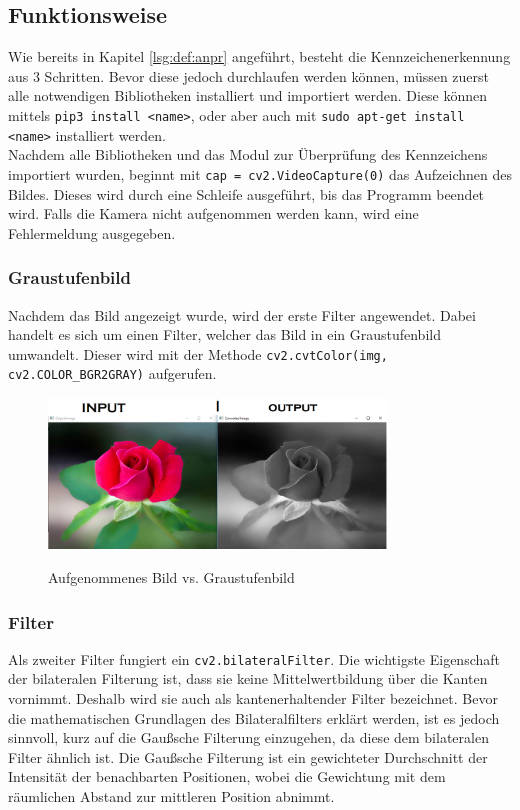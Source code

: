 \subsection{Funktionsweise}
Wie bereits in Kapitel \ref{lsg:def:anpr} angeführt, besteht die Kennzeichenerkennung aus 3 Schritten. Bevor diese jedoch durchlaufen werden können, müssen zuerst alle notwendigen Bibliotheken installiert und importiert werden. Diese können mittels \verb|pip3 install <name>|, oder aber auch mit \verb|sudo apt-get install <name>| installiert werden. \\
Nachdem alle Bibliotheken und das Modul zur Überprüfung des Kennzeichens importiert wurden, beginnt mit \verb|cap = cv2.VideoCapture(0)| das Aufzeichnen des Bildes. Dieses wird durch eine Schleife ausgeführt, bis das Programm beendet wird. Falls die Kamera nicht aufgenommen werden kann, wird eine Fehlermeldung ausgegeben.
\subsubsection{Graustufenbild}
Nachdem das Bild angezeigt wurde, wird der erste Filter angewendet. Dabei handelt es sich um einen Filter, welcher das Bild in ein Graustufenbild umwandelt. Dieser wird  mit der Methode \verb|cv2.cvtColor(img, cv2.COLOR_BGR2GRAY)| aufgerufen.
\begin{figure}[H]
\centering
\includegraphics[width=0.8\textwidth]{pics/Color2Gray.PNG}
\caption{Aufgenommenes Bild vs. Graustufenbild}
\cite{grayscaleImage}
\label{fig:anpr_1}
\end{figure}

\subsubsection{Filter}
Als zweiter Filter fungiert ein \verb|cv2.bilateralFilter|. Die wichtigste Eigenschaft der bilateralen Filterung ist, dass sie keine Mittelwertbildung über die Kanten vornimmt. Deshalb wird sie auch als kantenerhaltender Filter bezeichnet. Bevor  die mathematischen Grundlagen des Bilateralfilters erklärt werden, ist es jedoch sinnvoll, kurz auf die Gaußsche Filterung einzugehen, da diese dem bilateralen Filter ähnlich ist.
Die Gaußsche Filterung ist ein gewichteter Durchschnitt der Intensität der benachbarten Positionen, wobei die Gewichtung mit dem räumlichen Abstand zur mittleren Position abnimmt.

